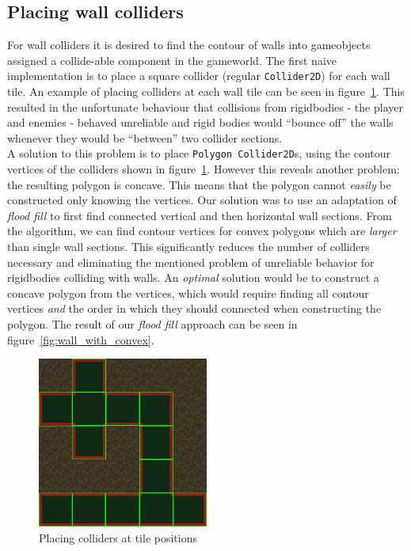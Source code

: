 \subsection{Placing wall colliders}
For wall colliders it is desired to find the contour of walls into gameobjects assigned a collide-able component in the gameworld.
The first naive implementation is to place a square collider (regular \texttt{Collider2D}) for each wall tile.
An example of placing colliders at each wall tile can be seen in figure~\ref{fig:wall_with_vertices}.
This resulted in the unfortunate behaviour that collisions from rigidbodies - the player and enemies - behaved unreliable and rigid bodies would ``bounce off'' the walls whenever they would be ``between'' two collider sections.
\\
A solution to this problem is to place \texttt{Polygon Collider2D}s, using the contour vertices of the colliders shown in figure~\ref{fig:wall_with_vertices}. 
However this reveals another problem: the resulting polygon is concave.
This means that the polygon cannot \textit{easily} be constructed only knowing the vertices.
Our solution was to use an adaptation of \textit{flood fill} to first find connected vertical and then horizontal wall sections.
From the algorithm, we can find contour vertices for convex polygons which are \textit{larger} than single wall sections.
This significantly reduces the number of colliders necessary and eliminating the mentioned problem of unreliable behavior for rigidbodies colliding with walls.
An \textit{optimal} solution would be to construct a concave polygon from the vertices, which would require finding all
contour vertices \textit{and} the order in which they should connected when constructing the polygon.
The result of our \textit{flood fill} approach can be seen in figure~\ref{fig:wall_with_convex}.

\begin{figure}[H]
    \centering
    \includegraphics[width=0.5\textwidth]{figures/generating_levels/wall_with_vertices.png}
    \caption{Placing colliders at tile positions}\label{fig:wall_with_vertices} 
\end{figure}

